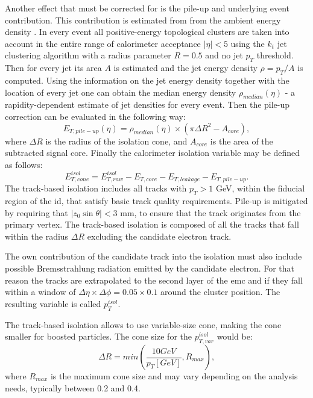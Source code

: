 	Another effect that must be corrected for is the pile-up and underlying event contribution. This contribution is estimated from from the ambient energy density \cite{Cacciari:2007fd}. In every event all positive-energy topological clusters are taken into account in the entire range of calorimeter acceptance  $|\eta|<5$ using the $k_t$ jet clustering algorithm with a radius parameter $R=0.5$ and no jet $p_T$ threshold. Then for every jet its area $A$ is estimated and the jet energy density $\rho=p_T/A$ is computed. Using the information on the jet energy density together with the location of every jet one can obtain the median energy density $\rho_{median}(\eta)$ - a rapidity-dependent estimate of jet densities for every event. Then the pile-up correction can be evaluated in the following way:
	\begin{equation}
		E_{T,pile-up}(\eta)=\rho_{median}(\eta)\times(\pi \Delta R^2 - A_{core}),
	\end{equation}
	where $\Delta R$ is the radius of the isolation cone, and $A_{core}$ is the area of the subtracted signal core. Finally the calorimeter isolation variable may be defined as follows:
	\begin{equation}
		E^{isol}_{T,cone}=E^{isol}_{T,raw}-E_{T,core}-E_{T,leakage}-E_{T,pile-up}.
	\end{equation}
	The track-based isolation includes all tracks with $p_T>1$ GeV, within the fiducial region of the \gls{id}, that satisfy basic track quality requirements. Pile-up is mitigated by requiring that $|z_0\sin{\theta}|<3$ mm, to ensure that the track originates from the primary vertex. The track-based isolation is composed of all the tracks that fall within the radius $\Delta R$ excluding the candidate electron track.
	
	The own contribution of the candidate track into the isolation must also include possible Bremsstrahlung radiation emitted by the candidate electron. For that reason the tracks are extrapolated to the second layer of the \gls{emc} and if they fall within a window of $\Delta \eta \times \Delta \phi = 0.05 \times 0.1$ around the cluster position. The resulting variable is called $p_T^{isol}$.
	
	The track-based isolation allows to use variable-size cone, making the cone smaller for boosted particles. The cone size for the $p_{T,var}^{isol}$ would be:
	\begin{equation}
		\Delta R=min\left(\frac{10 GeV}{p_T[GeV]},R_{max}\right),
	\end{equation}
	where $R_{max}$ is the maximum cone size and may vary depending on the analysis needs, typically between 0.2 and 0.4.
